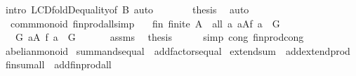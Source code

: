 \begin{isabellebody}
\ {\isacharparenleft}intro\ LCD{\isachardot}foldD{\isacharunderscore}equality{\isacharbrackleft}of\ B{\isacharbrackright}{\isacharcomma}\ auto{\isacharparenright}\isanewline
\isanewline
\ \ \isamarkupfalse%
\ {}\ {}\ \isamarkupfalse%
\ {\isacharquery}thesis\ \isamarkupfalse%
\ auto\isanewline
{}\isamarkupfalse%
%
\endisatagproof
{\isafoldproof}%
%
\isadelimproof
\isanewline
%
\endisadelimproof
\isanewline
{}\isamarkupfalse%
\ {\isacharparenleft}\ comm{\isacharunderscore}monoid{\isacharparenright}\ finprod{\isacharunderscore}all{}{\isacharbrackleft}simp{\isacharbrackright}{\isacharcolon}\isanewline
\ \ \ fin{\isacharcolon}\ {\isachardoublequoteopen}finite\ A{\isachardoublequoteclose}\ \ all{}{\isacharcolon}{\isachardoublequoteopen}\ {\isasymAnd}a{\isachardot}\ a{\isasymin}A{\isasymLongrightarrow}f\ a\ {\isacharequal}\ {\isasymone}\isactrlbsub G\isactrlesub {\isachardoublequoteclose}\isanewline
\ \ \ {\isachardoublequoteopen}{\isacharparenleft}{\isasymOtimes}\isactrlbsub G\isactrlesub \ a{\isasymin}A{\isachardot}\ f\ a{\isacharparenright}\ {\isacharequal}\ {\isasymone}\isactrlbsub G\isactrlesub {\isachardoublequoteclose}\isanewline
%
\isadelimproof
\isanewline
%
\endisadelimproof
%
\isatagproof
{}\isamarkupfalse%
\ {\isacharminus}\ \isanewline
\ \ \isamarkupfalse%
\ assms\ \isamarkupfalse%
\ {\isacharquery}thesis\isanewline
\ \ \ \ \isamarkupfalse%
\ {\isacharparenleft}simp\ cong{\isacharcolon}\ finprod{\isacharunderscore}cong{\isacharparenright}\isanewline
{}\isamarkupfalse%
%
\endisatagproof
{\isafoldproof}%
%
\isadelimproof
\isanewline
%
\endisadelimproof
\isanewline
{}\isamarkupfalse%
\ abelian{\isacharunderscore}monoid\isanewline
{}\isanewline
{}\isamarkupfalse%
\ summands{\isacharunderscore}equal\ {\isacharequal}\ add{\isachardot}factors{\isacharunderscore}equal\isanewline
{}\isamarkupfalse%
\ extend{\isacharunderscore}sum\ {\isacharequal}\ add{\isachardot}extend{\isacharunderscore}prod\isanewline
{}\isamarkupfalse%
\ finsum{\isacharunderscore}all{}\ {\isacharequal}\ add{\isachardot}finprod{\isacharunderscore}all{}\isanewline
{}\isamarkupfalse%
\isanewline
%
\isadelimtheory
\isanewline
%
\endisadelimtheory
%
\isatagtheory
{}\isamarkupfalse%
%
\endisatagtheory
{\isafoldtheory}%
%
\isadelimtheory
%
\endisadelimtheory
\end{isabellebody}%

